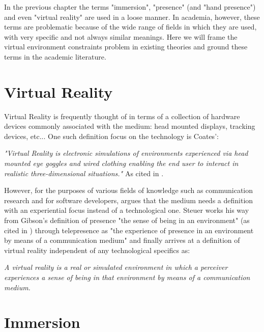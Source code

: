 In the previous chapter the terms "immersion", "presence" (and "hand presence") and even "virtual reality" are used in a loose manner. In academia, however, these terms are problematic because of the wide range of fields in which they are used, with very specific and not always similar meanings. Here we will frame the virtual environment constraints problem in existing theories and ground these terms in the academic literature.

\section{Virtual Reality}
\label{sec:vrDef}

Virtual Reality is frequently thought of in terms of a collection of hardware devices commonly associated with the medium: head mounted displays, tracking devices, etc... One such definition focus on the technology is Coates':

\begin{displayquote}
\textit{"Virtual Reality is electronic simulations of environments experienced via head mounted eye goggles and wired clothing enabling the end user to interact in realistic three-dimensional situations."} As cited in \parencite{Steuer1992}.
\end{displayquote}

However, for the purposes of various fields of knowledge such as communication research and for software developers, \parencite{Steuer1992} argues that the medium needs a definition with an experiential focus instead of a technological one. Steuer works his way from Gibson's definition of presence "the sense of being in an environment" (as cited in \parencite{Steuer1992}) through telepresence as "the experience of presence in an environment by means of a communication medium" \parencite{Steuer1992} and finally arrives at a definition of virtual reality independent of any technological specifics as:

\begin{displayquote}
\textit{A virtual reality is a real or simulated environment in which a perceiver experiences a sense of being in that environment by means of a communication medium.} \parencite{Steuer1992}
\end{displayquote}

\section{Immersion}
\label{sec:immersion}

